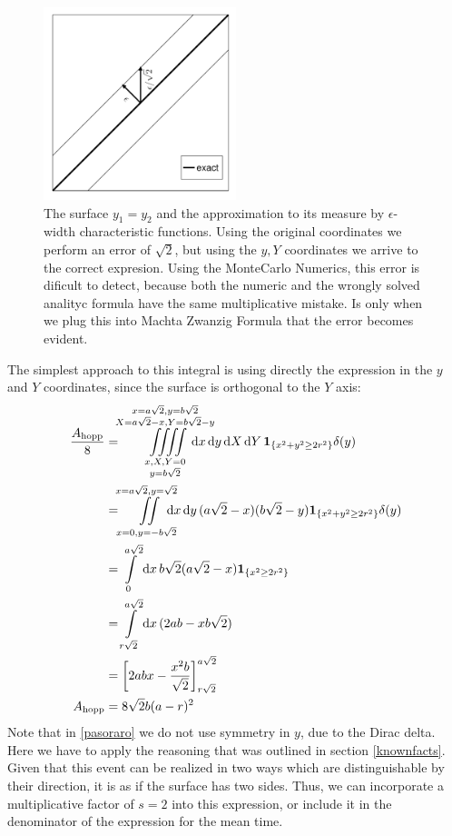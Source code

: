 \documentclass[superscriptaddress,pre,reprint,showpacs,twocolumn]{revtex4-1}
\newcommand{\rd}[1]{\mathrm{d}{#1} \,}
\newcommand{\indicatorsymbol}{\mathbf{1}}
\newcommand{\indicator}[1]{\indicatorsymbol_{ \{   #1 \} } }
\begin{document}
\begin{figure}
\includegraphics[width=0.5\textwidth]{figures/diagramdelta01.pdf}
\caption{The surface $y_1=y_2$ and the approximation to its measure by
  $\epsilon$-width characteristic functions. Using the original coordinates
  we perform an error of $\sqrt{2}$, but using the $y,Y$ coordinates
  we arrive to the correct expresion. Using the MonteCarlo Numerics, this
  error is dificult to detect, because both the numeric and the wrongly solved
  analityc formula have the same multiplicative mistake. Is only when we plug this into
Machta Zwanzig Formula that the error becomes evident. }\label{DiagramaDelta01}
\end{figure}

The simplest approach to this integral is using directly the expression in the $y$ and $Y$
coordinates, since the surface is orthogonal to the $Y$ axis:
  \begin{align} 
    \frac{A_\text{hopp}}{8} & = \iiiint \limits_
      {\substack{x, X, Y=0 \\ y=b\sqrt{2}}}^
               {\substack{x=a\sqrt{2}, y=b\sqrt{2} \\
                   X=a\sqrt{2}-x, Y =b \sqrt{2}-y }}
                \mkern-36mu
     \rd x   \rd y  \rd X   \rd Y
     \indicator{x^2+y^2 \geq 2 r^2} \delta (y)
     \label{pasoraro}
     \\   
     &=  \iint \limits_{x=0, y=-b\sqrt{2}}^{x=a\sqrt{2}, y=\sqrt{2}}
    \mkern-18mu  \rd x \rd y 
    (a\sqrt{2}-x)(b\sqrt{2}-y)
    \indicator{x^2+y^2 \geq 2 r^2} \delta (y)
    \\
    &= \int \limits _0^{a\sqrt{2}} \rd x
    b\sqrt{2} (a\sqrt{2}-x)
    \indicator{x^2\geq 2 r^2}
    \\
    &= \int\limits_{r\sqrt{2}}^{a\sqrt{2}} \rd x
    (2ab-xb\sqrt{2})
    \\
    &=\biggl[2abx-\frac{x^2b}{\sqrt{2}} \biggr]_{r\sqrt{2}}^{a\sqrt{2}}\\
      A_\text{hopp}&=8\sqrt{2}b(a-r)^2
  \end{align}
  Note that in \eqref{pasoraro} we do not use symmetry in
  $y$, due to the Dirac delta.
  Here we have to apply the reasoning that was outlined in section \ref{knownfacts}.
  Given that this event can be realized in two ways which are
  distinguishable by their direction, it is as if the surface has two sides.
  Thus, we can incorporate a multiplicative factor of $s=2$ into this expression, or include it in the denominator of 
  the expression for the mean time.
\end{document}
